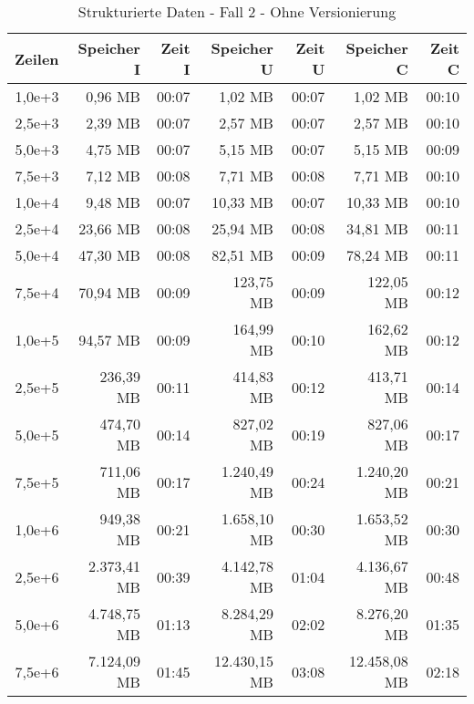 \begin{table}
    \centering
    \begin{tabular}{|r|r|r|r|r|r|r|}
        \hline
        \textbf{Zeilen} & \textbf{Speicher I} & \textbf{Zeit I} & \textbf{Speicher U} & \textbf{Zeit U} & \textbf{Speicher C} & \textbf{Zeit C} \\ \hline
        1,0e+3  & 0,96 MB       & 00:07 & 1,02 MB       & 00:07 & 1,02 MB       & 00:10 \\ \hline
        2,5e+3  & 2,39 MB       & 00:07 & 2,57 MB       & 00:07 & 2,57 MB       & 00:10 \\ \hline
        5,0e+3  & 4,75 MB       & 00:07 & 5,15 MB       & 00:07 & 5,15 MB       & 00:09 \\ \hline
        7,5e+3  & 7,12 MB       & 00:08 & 7,71 MB       & 00:08 & 7,71 MB       & 00:10 \\ \hline
        1,0e+4  & 9,48 MB       & 00:07 & 10,33 MB      & 00:07 & 10,33 MB      & 00:10 \\ \hline
        2,5e+4  & 23,66 MB      & 00:08 & 25,94 MB      & 00:08 & 34,81 MB      & 00:11 \\ \hline
        5,0e+4  & 47,30 MB      & 00:08 & 82,51 MB      & 00:09 & 78,24 MB      & 00:11 \\ \hline
        7,5e+4  & 70,94 MB      & 00:09 & 123,75 MB     & 00:09 & 122,05 MB     & 00:12 \\ \hline
        1,0e+5  & 94,57 MB      & 00:09 & 164,99 MB     & 00:10 & 162,62 MB     & 00:12 \\ \hline
        2,5e+5  & 236,39 MB     & 00:11 & 414,83 MB     & 00:12 & 413,71 MB     & 00:14 \\ \hline
        5,0e+5  & 474,70 MB     & 00:14 & 827,02 MB     & 00:19 & 827,06 MB     & 00:17 \\ \hline
        7,5e+5  & 711,06 MB     & 00:17 & 1.240,49 MB   & 00:24 & 1.240,20 MB   & 00:21 \\ \hline
        1,0e+6  & 949,38 MB     & 00:21 & 1.658,10 MB   & 00:30 & 1.653,52 MB   & 00:30 \\ \hline
        2,5e+6  & 2.373,41 MB   & 00:39 & 4.142,78 MB   & 01:04 & 4.136,67 MB   & 00:48 \\ \hline
        5,0e+6  & 4.748,75 MB   & 01:13 & 8.284,29 MB   & 02:02 & 8.276,20 MB   & 01:35 \\ \hline
        7,5e+6  & 7.124,09 MB   & 01:45 & 12.430,15 MB  & 03:08 & 12.458,08 MB  & 02:18 \\ \hline
    \end{tabular}
    \caption{Strukturierte Daten - Fall 2 - Ohne Versionierung}
\end{table}

